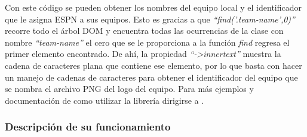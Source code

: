 Con este código se pueden obtener los nombres del equipo local y el identificador que le asigna ESPN a sus equipos. Esto es gracias a que \emph{``find('.team-name',0)''} recorre todo el árbol DOM y encuentra todas las ocurrencias de la clase con nombre \emph{``team-name''} el cero que se le proporciona a la función \emph{find} regresa el primer elemento encontrado. De ahí, la propiedad \emph{``->innertext''} muestra la cadena de caracteres plana que contiene ese elemento, por lo que basta con hacer un manejo de cadenas de caracteres para obtener el identificador del equipo que se nombra el archivo PNG del logo del equipo. Para más ejemplos y documentación de como utilizar la librería dirigirse a \cite{sourceparserWeb}.
%
%
%
%
%


\subsubsection{Descripción de su funcionamiento}

